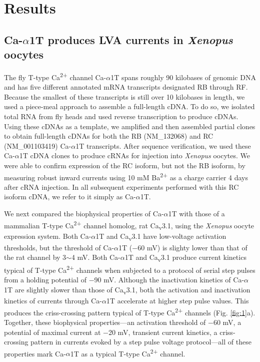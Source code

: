 \section*{Results}

\subsection*{Ca-$\alpha$1T produces LVA currents in \emph{Xenopus} oocytes}

The fly T-type Ca\textsuperscript{2+} channel Ca-$\alpha$1T spans roughly 90 kilobases of genomic DNA and has five different annotated mRNA transcripts designated RB through RF.
Because the smallest of these transcripts is still over 10 kilobases in length, we used a piece-meal approach to assemble a full-length cDNA.
To do so, we isolated total RNA from fly heads and used reverse transcription to produce cDNAs.
Using these cDNAs as a template, we amplified and then assembled partial clones to obtain full-length cDNAs for both the RB (NM_132068) and RC (NM_001103419) Ca-$\alpha$1T transcripts.
After sequence verification, we used these Ca-$\alpha$1T cDNA clones to produce cRNAs for injection into \emph{Xenopus} oocytes.
We were able to confirm expression of the RC isoform, but not the RB isoform, by measuring robust inward currents using 10 mM Ba\textsuperscript{2+} as a charge carrier 4 days after cRNA injection. 
In all subsequent experiments performed with this RC isoform cDNA, we refer to it simply as Ca-$\alpha$1T.

We next compared the biophysical properties of Ca-$\alpha$1T with those of a mammalian T-type Ca\textsuperscript{2+} channel homolog, rat Ca\textsubscript{v}3.1\cite{PerezReyes:1998gn}, using the \emph{Xenopus} oocyte expression system.
Both Ca-$\alpha$1T and Ca\textsubscript{v}3.1 have low-voltage activation thresholds, but the threshold of Ca-$\alpha$1T ($-$60 mV) is slighty lower than that of the rat channel by 3$\sim$4 mV.
Both Ca-$\alpha$1T and Ca\textsubscript{v}3.1 produce current kinetics typical of T-type Ca\textsuperscript{2+} channels when subjected to a protocol of serial step pulses from a holding potential of $-$90 mV.
Although the inactivation kinetics of Ca-$\alpha$1T are slightly slower than those of Ca\textsubscript{v}3.1, both the activation and inactivation kinetics of currents through Ca-$\alpha$1T accelerate at higher step pulse values. This produces the criss-crossing pattern typical of T-type Ca\textsuperscript{2+} channels (Fig. \ref{fig:1}a).
Together, these biophysical properties---an activation threshold of $-$60 mV, a potential of maximal current at $-$20 mV, transient current kinetics, a criss-crossing pattern in currents evoked by a step pulse voltage protocol---all of these properties mark Ca-$\alpha$1T as a typical T-type Ca\textsuperscript{2+} channel\cite{PerezReyes:1998gn,carbone:1984aa,Cribbs:1998vc,lee:1999aa}.


